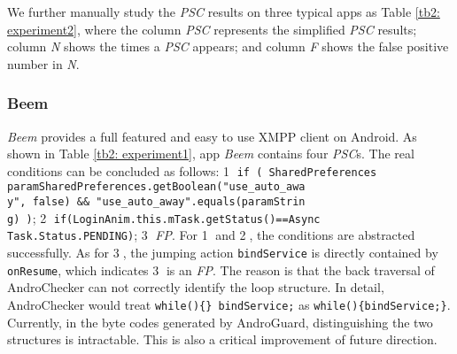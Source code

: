 We further manually study the \textit{PSC} results on three typical apps as Table \ref{tb2: experiment2}, where the column \textit{PSC} represents the simplified \textit{PSC} results; column \textit{N} shows the times a \textit{PSC} appears;  
and column \textit{F} shows the false positive number in \textit{N}. 

\subsubsection{Beem}
\textit{Beem} provides a full featured and easy to use XMPP client on Android. As shown in Table \ref{tb2: experiment1}, app \textit{Beem} contains four \textit{PSC}s.
The real conditions can be concluded as follows: \textcircled{1} \texttt{if ( SharedPreferences paramSharedPreferences.getBoolean("use\_auto\_awa}  \\
\texttt{y", false) \&\& "use\_auto\_away".equals(paramStrin}\\
\texttt{g) )}; \textcircled{2} \texttt{if(LoginAnim.this.mTask.getStatus()==Async}\\
\texttt{Task.Status.PENDING)}; \textcircled{3} \textit{FP}. For  \textcircled{1} and \textcircled{2}, the conditions are abstracted successfully. As for \textcircled{3}, the jumping action \texttt{bindService} is directly contained by \texttt{onResume}, which indicates \textcircled{3} is an \textit{FP}. The reason is that the back traversal of AndroChecker can not correctly identify the loop structure. In detail, AndroChecker would treat \texttt{while()\{\} bindService;} as \texttt{while()\{bindService;\}}. Currently, in the byte codes generated by AndroGuard, distinguishing the two structures is intractable. This is also a critical improvement of future direction.


